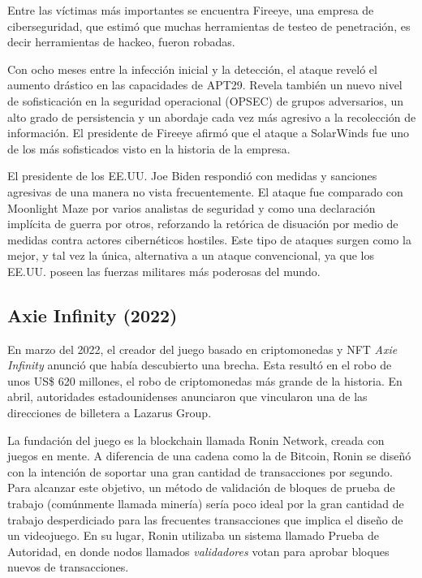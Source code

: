 \documentclass{article}
\begin{document}
Entre las víctimas más importantes se encuentra Fireeye, una empresa de ciberseguridad, que estimó que muchas herramientas de testeo de penetración, es decir herramientas de hackeo, fueron robadas. 

Con ocho meses entre la infección inicial y la detección, el ataque reveló el aumento drástico en las capacidades de APT29. Revela también un nuevo nivel de sofisticación en la seguridad operacional (OPSEC) de grupos adversarios, un alto grado de persistencia y un abordaje cada vez más agresivo a la recolección de información. El presidente de Fireeye afirmó que el ataque a SolarWinds fue uno de los más sofisticados visto en la historia de la empresa. \autocite{fireeye-solarwinds} \autocite{mandiant-solarwinds}

El presidente de los EE.UU. Joe Biden respondió con medidas y sanciones agresivas de una manera no vista frecuentemente. El ataque fue comparado con Moonlight Maze por varios analistas de seguridad y como una declaración implícita de guerra por otros, reforzando la retórica de disuación por medio de medidas contra actores cibernéticos hostiles. Este tipo de ataques surgen como la mejor, y tal vez la única, alternativa a un ataque convencional, ya que los EE.UU. poseen las fuerzas militares más poderosas del mundo. \autocite{cnbc-solarwinds}

\subsection{Axie Infinity (2022)}
En marzo del 2022, el creador del juego basado en criptomonedas y NFT {\it Axie Infinity} anunció que había descubierto una brecha. Esta resultó en el robo de unos US\$ 620 millones, el robo de criptomonedas más grande de la historia. En abril, autoridades estadounidenses anunciaron que vincularon una de las direcciones de billetera a Lazarus Group. \autocite{washingtonpost-axie}

La fundación del juego es la blockchain llamada Ronin Network, creada con juegos en mente. A diferencia de una cadena como la de Bitcoin, Ronin se diseñó con la intención de soportar una gran cantidad de transacciones por segundo. Para alcanzar este objetivo, un método de validación de bloques de prueba de trabajo (comúnmente llamada minería) sería poco ideal por la gran cantidad de trabajo desperdiciado para las frecuentes transacciones que implica el diseño de un videojuego. En su lugar, Ronin utilizaba un sistema llamado Prueba de Autoridad, en donde nodos llamados {\it validadores} votan para aprobar bloques nuevos de transacciones. \autocite{ronin-intro}
\end{document}
